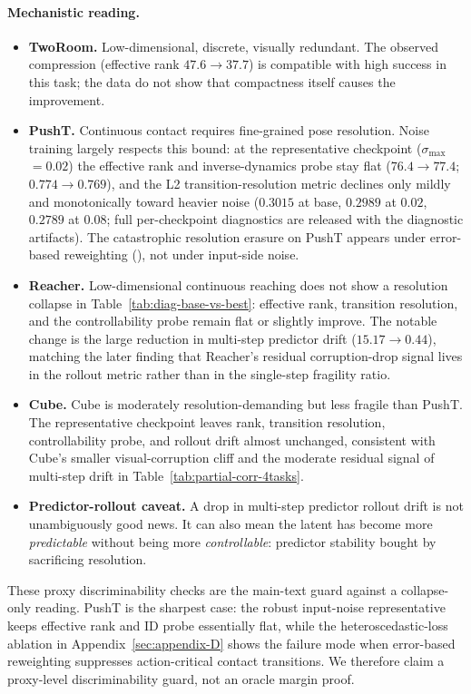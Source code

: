 \documentclass[10pt]{article}
\newcommand{\stdmax}{\ensuremath{\sigma_{\max}}}
\newcommand{\fragility}{fragility ratio}
\begin{document}
\paragraph{Mechanistic reading.}
\begin{itemize}
  \item \textbf{TwoRoom.} Low-dimensional, discrete, visually redundant. The observed compression (effective rank $47.6 \to 37.7$) is compatible with high success in this task; the data do not show that compactness itself causes the improvement.
  \item \textbf{PushT.} Continuous contact requires fine-grained pose resolution. Noise training largely respects this bound: at the representative checkpoint (\stdmax{} $= 0.02$) the effective rank and inverse-dynamics probe stay flat ($76.4 \to 77.4$; $0.774 \to 0.769$), and the L2 transition-resolution metric declines only mildly and monotonically toward heavier noise ($0.3015$ at base, $0.2989$ at $0.02$, $0.2789$ at $0.08$; full per-checkpoint diagnostics are released with the diagnostic artifacts). The catastrophic resolution erasure on PushT appears under error-based reweighting (), not under input-side noise.
  \item \textbf{Reacher.} Low-dimensional continuous reaching does not show a resolution collapse in Table~\ref{tab:diag-base-vs-best}: effective rank, transition resolution, and the controllability probe remain flat or slightly improve. The notable change is the large reduction in multi-step predictor drift ($15.17 \to 0.44$), matching the later finding that Reacher's residual corruption-drop signal lives in the rollout metric rather than in the single-step \fragility{}.
  \item \textbf{Cube.} Cube is moderately resolution-demanding but less fragile than PushT. The representative checkpoint leaves rank, transition resolution, controllability probe, and rollout drift almost unchanged, consistent with Cube's smaller visual-corruption cliff and the moderate residual signal of multi-step drift in Table~\ref{tab:partial-corr-4tasks}.
  \item \textbf{Predictor-rollout caveat.} A drop in multi-step predictor rollout drift is not unambiguously good news. It can also mean the latent has become more \emph{predictable} without being more \emph{controllable}: predictor stability bought by sacrificing resolution.
\end{itemize}

These proxy discriminability checks are the main-text guard against a collapse-only reading. PushT is the sharpest case: the robust input-noise representative keeps effective rank and ID probe essentially flat, while the heteroscedastic-loss ablation in Appendix~\ref{sec:appendix-D} shows the failure mode when error-based reweighting suppresses action-critical contact transitions. We therefore claim a proxy-level discriminability guard, not an oracle margin proof.
\end{document}

